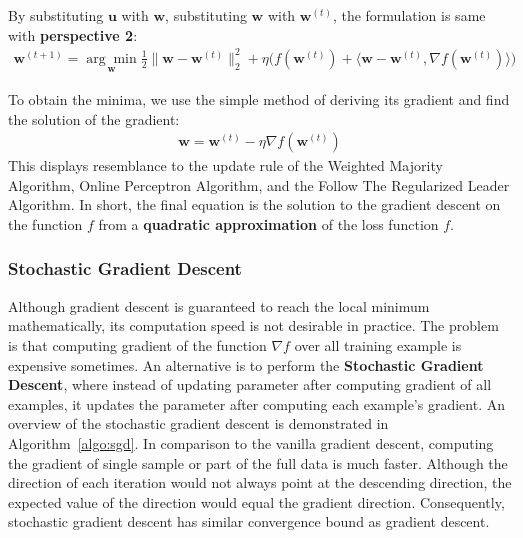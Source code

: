 \documentclass[11pt]{article}
\newcommand{\bw}{\boldsymbol{w}}
\newcommand{\bu}{\boldsymbol{u}}
\begin{document}
By substituting $\bu$ with $\bw$, substituting $\bw$ with $\bw^{(t)}$, the formulation is same with \textbf{perspective 2}:
\begin{equation*}
\begin{split}
\bw^{(t+1)} = 
\underset{\bw}{\arg\min} \frac{1}{2} \| \bw - \bw^{(t)} \|_2^2 
+ \eta\Big(f(\bw^{(t)}) + \langle \bw-\bw^{(t)}, \nabla f(\bw^{(t)}) \rangle \Big)
\end{split}
\end{equation*}

To obtain the minima, we use the simple method of deriving its gradient and find the solution of the gradient:
%
\begin{equation*}
\begin{split}
\bw = \bw^{(t)} - \eta \nabla f(\bw^{(t)})
\end{split}
\end{equation*}
%
This displays resemblance to the update rule of the Weighted Majority Algorithm, 
Online Perceptron Algorithm, and the Follow The Regularized Leader Algorithm. In short, the final equation is the solution to the gradient descent on the function $f$ from a \textbf{quadratic approximation} of the loss function $f$.

\subsubsection{Stochastic Gradient Descent}
Although gradient descent is guaranteed to reach the local minimum mathematically, its computation speed is not desirable in practice. The problem is that computing gradient of the function $\nabla f$ over all training example is expensive sometimes. An alternative is to perform the \textbf{Stochastic Gradient Descent}, where instead of updating parameter after computing gradient of all examples, it updates the parameter after computing each example's gradient. An overview of the stochastic gradient descent is demonstrated in Algorithm~\ref{algo:sgd}.
%
In comparison to the vanilla gradient descent, computing the gradient of single sample or part of the full data is much faster. Although the direction of each iteration would not always point at the descending direction, the expected value of the direction would equal the gradient direction. Consequently, stochastic gradient descent has similar convergence bound as gradient descent.
\end{document}
